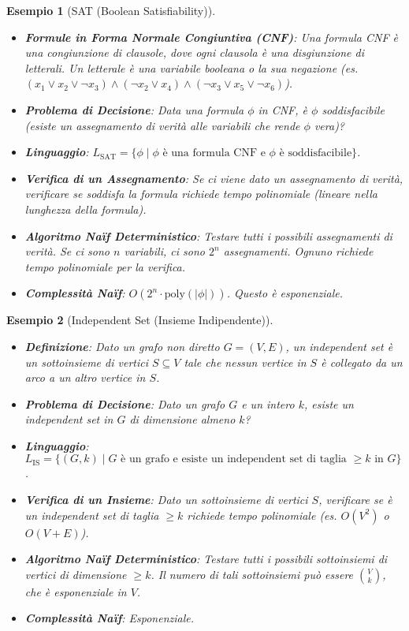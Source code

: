\documentclass[a4paper]{article}
\newtheorem{example}{Esempio}[section]
\begin{document}
\begin{example}[SAT (Boolean Satisfiability)]
\begin{itemize}
    \item \textbf{Formule in Forma Normale Congiuntiva (CNF)}: Una formula CNF è una congiunzione di clausole, dove ogni clausola è una disgiunzione di letterali. Un letterale è una variabile booleana o la sua negazione (es. $(x_1 \lor x_2 \lor \neg x_3) \land (\neg x_2 \lor x_4) \land (\neg x_3 \lor x_5 \lor \neg x_6)$).
    \item \textbf{Problema di Decisione}: Data una formula $\phi$ in CNF, è $\phi$ soddisfacibile (esiste un assegnamento di verità alle variabili che rende $\phi$ vera)?
    \item \textbf{Linguaggio}: $L_{\text{SAT}} = \{ \phi \mid \phi \text{ è una formula CNF e } \phi \text{ è soddisfacibile} \}$.
    \item \textbf{Verifica di un Assegnamento}: Se ci viene dato un assegnamento di verità, verificare se soddisfa la formula richiede tempo polinomiale (lineare nella lunghezza della formula).
    \item \textbf{Algoritmo Naïf Deterministico}: Testare tutti i possibili assegnamenti di verità. Se ci sono $n$ variabili, ci sono $2^n$ assegnamenti. Ognuno richiede tempo polinomiale per la verifica.
    \item \textbf{Complessità Naïf}: $O(2^n \cdot \text{poly}(|\phi|))$. Questo è esponenziale.
\end{itemize}
\end{example}

\begin{example}[Independent Set (Insieme Indipendente)]
\begin{itemize}
    \item \textbf{Definizione}: Dato un grafo non diretto $G=(V, E)$, un \emph{independent set} è un sottoinsieme di vertici $S \subseteq V$ tale che nessun vertice in $S$ è collegato da un arco a un altro vertice in $S$.
    \item \textbf{Problema di Decisione}: Dato un grafo $G$ e un intero $k$, esiste un independent set in $G$ di dimensione almeno $k$?
    \item \textbf{Linguaggio}: $L_{\text{IS}} = \{ (G, k) \mid G \text{ è un grafo e esiste un independent set di taglia } \ge k \text{ in } G \}$.
    \item \textbf{Verifica di un Insieme}: Dato un sottoinsieme di vertici $S$, verificare se è un independent set di taglia $\ge k$ richiede tempo polinomiale (es. $O(V^2)$ o $O(V+E)$).
    \item \textbf{Algoritmo Naïf Deterministico}: Testare tutti i possibili sottoinsiemi di vertici di dimensione $\ge k$. Il numero di tali sottoinsiemi può essere $\binom{V}{k}$, che è esponenziale in $V$.
    \item \textbf{Complessità Naïf}: Esponenziale.
\end{itemize}
\end{example}
\end{document}
